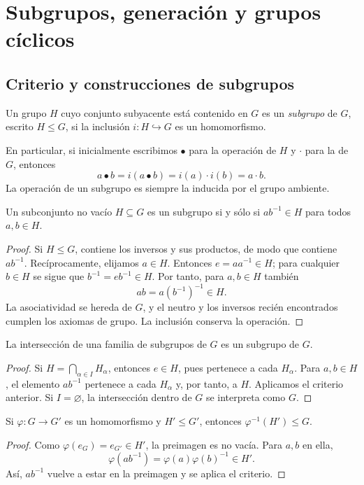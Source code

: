 \section{Subgrupos, generación y grupos cíclicos}\label{sec:grupos-subgrupos}

\subsection{Criterio y construcciones de subgrupos}\label{tema:4-2-1}
\begin{defi}
Un grupo $H$ cuyo conjunto subyacente está contenido en $G$ es un \emph{subgrupo} de $G$, escrito $H\le G$, si la inclusión $i:H\hookrightarrow G$ es un homomorfismo.
\end{defi}
En particular, si inicialmente escribimos $\bullet$ para la operación de $H$ y $\cdot$ para la de $G$, entonces
\[
a\bullet b=i(a\bullet b)=i(a)\cdot i(b)=a\cdot b.
\]
La operación de un subgrupo es siempre la inducida por el grupo ambiente.

\begin{prop}\label{prop:C4-criterio}
Un subconjunto no vacío $H\subseteq G$ es un subgrupo si y sólo si $ab^{-1}\in H$ para todos $a,b\in H$.
\end{prop}
\begin{proof}
Si $H\le G$, contiene los inversos y sus productos, de modo que contiene $ab^{-1}$. Recíprocamente, elijamos $a\in H$. Entonces $e=aa^{-1}\in H$; para cualquier $b\in H$ se sigue que $b^{-1}=eb^{-1}\in H$. Por tanto, para $a,b\in H$ también
\[
ab=a(b^{-1})^{-1}\in H.
\]
La asociatividad se hereda de $G$, y el neutro y los inversos recién encontrados cumplen los axiomas de grupo. La inclusión conserva la operación.
\end{proof}

\begin{lema}\label{lema:C4-interseccion}
La intersección de una familia de subgrupos de $G$ es un subgrupo de $G$.
\end{lema}
\begin{proof}
Si $H=\bigcap_{\alpha\in I}H_\alpha$, entonces $e\in H$, pues pertenece a cada $H_\alpha$. Para $a,b\in H$, el elemento $ab^{-1}$ pertenece a cada $H_\alpha$ y, por tanto, a $H$. Aplicamos el criterio anterior. Si $I=\varnothing$, la intersección dentro de $G$ se interpreta como $G$.
\end{proof}

\begin{lema}\label{lema:C4-preimagen}
Si $\varphi:G\to G'$ es un homomorfismo y $H'\le G'$, entonces $\varphi^{-1}(H')\le G$.
\end{lema}
\begin{proof}
Como $\varphi(e_G)=e_{G'}\in H'$, la preimagen es no vacía. Para $a,b$ en ella,
\[
\varphi(ab^{-1})=\varphi(a)\varphi(b)^{-1}\in H'.
\]
Así, $ab^{-1}$ vuelve a estar en la preimagen y se aplica el criterio.
\end{proof}

